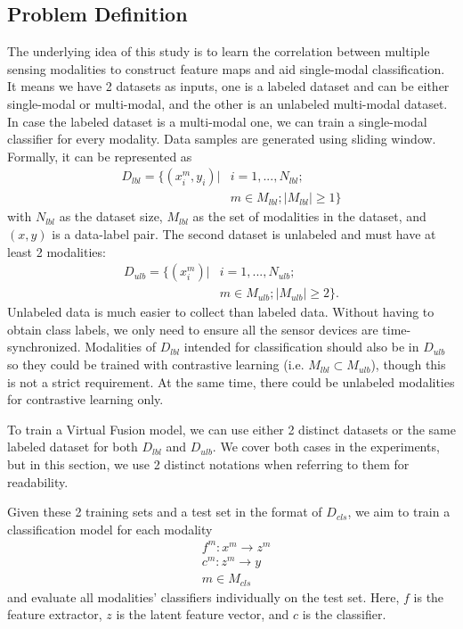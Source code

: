 \documentclass[conference]{IEEEtran}
\begin{document}
\subsection{Problem Definition}
\label{subsec: prob def}
The underlying idea of this study is to learn the correlation between multiple sensing modalities to construct feature maps and aid single-modal classification. It means we have 2 datasets as inputs, one is a labeled dataset and can be either single-modal or multi-modal, and the other is an unlabeled multi-modal dataset. In case the labeled dataset is a multi-modal one, we can train a single-modal classifier for every modality. Data samples are generated using sliding window. Formally, it can be represented as
\begin{equation}
\begin{aligned}
D_{lbl} = \{(x_i^m, y_i) | &i=1,...,N_{lbl}; \\&m\in M_{lbl}; |M_{lbl}| \geq 1\}
\end{aligned}
\end{equation}
with $N_{lbl}$ as the dataset size, $M_{lbl}$ as the set of modalities in the dataset, and $(x,y)$ is a data-label pair. The second dataset is unlabeled and must have at least 2 modalities:
\begin{equation}
\begin{aligned}
D_{ulb} = \{(x_i^m) | &i=1,...,N_{ulb}; \\&m\in M_{ulb}; |M_{ulb}| \geq 2\}.
\end{aligned}
\end{equation}
Unlabeled data is much easier to collect than labeled data. Without having to obtain class labels, we only need to ensure all the sensor devices are time-synchronized. Modalities of $D_{lbl}$ intended for classification should also be in $D_{ulb}$ so they could be trained with contrastive learning (i.e. $M_{lbl} \subset M_{ulb}$), though this is not a strict requirement. At the same time, there could be unlabeled modalities for contrastive learning only.

To train a Virtual Fusion model, we can use either 2 distinct datasets or the same labeled dataset for both $D_{lbl}$ and $D_{ulb}$. We cover both cases in the experiments, but in this section, we use 2 distinct notations when referring to them for readability.

Given these 2 training sets and a test set in the format of $D_{cls}$, we aim to train a classification model for each modality
\begin{equation}
\begin{aligned}
    &f^m: x^m \rightarrow z^m\\
    &c^m: z^m \rightarrow y\\
    &m \in M_{cls}
\end{aligned}
\end{equation}
and evaluate all modalities' classifiers individually on the test set. Here, $f$ is the feature extractor, $z$ is the latent feature vector, and $c$ is the classifier.
\end{document}
